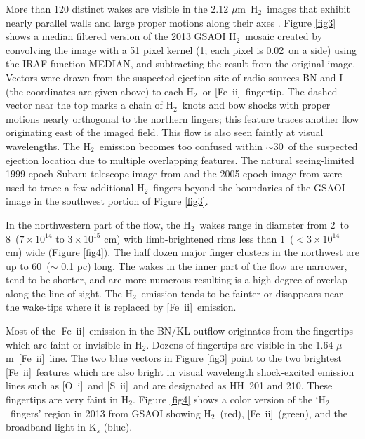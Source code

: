 \documentclass{aa}
\newcommand{\sii}{[S~{\sc ii]}}
\newcommand{\Feii}{[Fe~{\sc ii}]}
\newcommand{\oi}{[O~{\sc i}]}
\newcommand{\um}{$\mu$m}
\newcommand{\hh}{\ensuremath{\textrm{H}_{2}}}			%
\begin{document}
More than 120 distinct wakes are visible in the 2.12 \um\  \hh\  images
that exhibit nearly parallel walls and large proper motions along their axes
\citep{Bally2011}.        Figure \ref{fig3}  shows a median filtered version of the 
2013 GSAOI \hh\ mosaic  created by convolving the  image with a 51 pixel 
kernel (1\arcsec ; each pixel is   0.02\arcsec\  on a side) using the 
IRAF function MEDIAN, and subtracting  the result from the original image.   
Vectors were drawn from the suspected ejection site of radio sources BN and 
I (the coordinates are given  above) to each \hh\ or \Feii\ fingertip.  
The dashed vector near  the top marks a chain of  \hh\ knots and bow shocks with 
proper motions nearly orthogonal to the  northern fingers;  this feature traces 
another  flow originating east of the imaged field.
This flow is also seen faintly at visual wavelengths.    
The \hh\  emission becomes too confused within $\sim$30\arcsec\  of the suspected 
ejection location due to multiple overlapping features.     The natural seeing-limited 
1999 epoch Subaru telescope image from \citet{Kaifu2000} and the 2005 epoch 
image from \citet{Bally2011} were used to  trace a few additional \hh\  fingers 
beyond the boundaries of the GSAOI image in the southwest portion of Figure \ref{fig3}.    

In the northwestern  part of the flow, the \hh\ wakes range in diameter  from 2\arcsec\  
to 8\arcsec\  ($7 \times 10^{14}$ to $3 \times 10^{15}$ cm)  with limb-brightened rims 
less than 1\arcsec\  ($< 3 \times 10^{14}$ cm) wide (Figure \ref{fig4}).   
The half dozen major  finger clusters in the northwest are up to 60\arcsec\   ($\sim$ 0.1 pc) long.  
The wakes in the inner part of the flow are narrower, tend to be shorter, and are 
more numerous resulting is a high degree of overlap along the line-of-sight.   
The \hh\ emission tends to be fainter or disappears near the wake-tips where it is 
replaced by \Feii\ emission.    

Most of the \Feii\ emission in the BN/KL outflow originates from the fingertips which 
are faint or invisible in \hh .    Dozens of  fingertips are visible  in the 1.64 \um\ \Feii\ line.   
The two blue vectors in Figure \ref{fig3} point to the two  brightest \Feii\ features which are also
bright in visual wavelength shock-excited emission lines such as \oi\ and \sii\  and are
designated as HH~201 and 210.    These fingertips are very faint in \hh .   
Figure \ref{fig4} shows a color version of  the `\hh\ fingers'  region in 2013 from GSAOI 
showing \hh\ (red),  \Feii\  (green), and the broadband light in K$_s$ (blue). 
\end{document}
